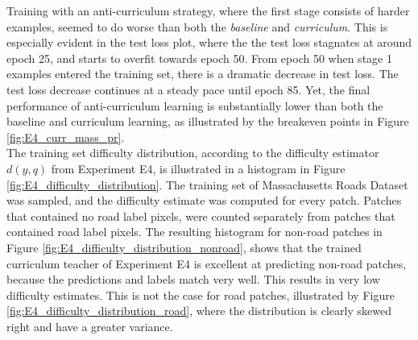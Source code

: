 Training with an anti-curriculum strategy, where the first stage consists of harder examples, seemed to do worse than both the \textit{baseline} and \textit{curriculum}. This is especially evident in the test loss plot, where the the test loss stagnates at around epoch 25, and starts to overfit towards epoch 50. From epoch 50 when stage 1 examples entered the training set, there is a dramatic decrease in test loss. The test loss decrease continues at a steady pace until epoch 85. Yet, the final performance of anti-curriculum learning is substantially lower than both the baseline and curriculum learning, as illustrated by the breakeven points in Figure \ref{fig:E4_curr_mass_pr}.\\

The training set difficulty distribution, according to the difficulty estimator $d(y,q)$ from Experiment E4, is illustrated in a histogram in Figure \ref{fig:E4_difficulty_distribution}. The training set of  Massachusetts Roads Dataset was sampled, and the difficulty estimate was computed for every patch. Patches that contained no road label pixels, were counted separately from patches that contained road label pixels. The resulting histogram for non-road patches in Figure \ref{fig:E4_difficulty_distribution_nonroad}, shows that the trained curriculum teacher of Experiment E4 is excellent at predicting non-road patches, because the predictions and labels match very well. This results in very low difficulty estimates. This is not the case for road patches, illustrated by Figure  \ref{fig:E4_difficulty_distribution_road}, where the distribution is clearly skewed right and have a greater variance. \\

